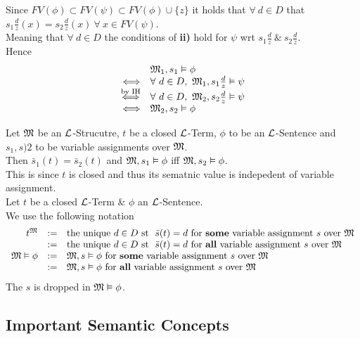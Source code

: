 \documentclass[11pt,a4paper]{article}
\begin{document}
Since $FV(\phi)\subset FV(\psi)\subset FV(\phi)\cup\{z\}$ it holds that $\forall\ d\in D$ that $s_1\frac{d}{z}(x)=s_2\frac{d}{z}(x)\ \forall\ x\in FV(\psi)$.\\
Meaning that $\forall\ d\in D$ the conditions of \textbf{ii)} hold for $\psi$ wrt $s_1\frac{d}{z}\ \&\ s_2\frac{d}{z}$.\\
Hence
\[\begin{array}{rl}
&\M_1,s_1\vDash\phi\\
\Longleftrightarrow&\forall\ d\in D,\ \M_1,s_1\frac{d}{z}\vDash\psi\\
\overset{\text{by IH}}\Longleftrightarrow&\forall\ d\in D,\ \M_2,s_2\frac{d}{z}\vDash\psi\\
\Longleftrightarrow&\M_2,s_2\vDash\phi
\end{array}\]\proved

\theorem{}
Let $\mathfrak{M}$ be an $\mathcal{L}$-Strucutre, $t$ be a closed $\mathcal{L}$-Term, $\phi$ to be an $\mathcal{L}$-Sentence and $s_1,s)2$ to be variable assignments over $\mathfrak{M}$.\\
Then $\bar{s}_1(t)=\bar{s}_2(t)$ and $\mathfrak{M},s_1\vDash\phi$ iff $\mathfrak{M},s_2\vDash\phi$.\\
\nb This is since $t$ is closed and thus its sematnic value is indepedent of variable assignment.\\

\notation{}
Let $t$ be a closed $\mathcal{L}$-Term \& $\phi$ an $\mathcal{L}$-Sentence.\\
We use the following notation
\[\begin{array}{rcl}
t^{\mathfrak{M}}&:=&\text{the unique }d\in D\text{ st }\ \bar{s}(t)=d\text{ for \textbf{some} variable assignment }s\text{ over }\mathfrak{M}\\
&:=&\text{the unique }d\in D\text{ st }\ \bar{s}(t)=d\text{ for \textbf{all} variable assignment }s\text{ over }\mathfrak{M}\\
\mathfrak{M}\vDash\phi&:=&\mathfrak{M},s\vDash\phi\text{ for \textbf{some} variable assignment }s\text{ over }\mathfrak{M}\\
&:=&\mathfrak{M},s\vDash\phi\text{ for \textbf{all} variable assignment }s\text{ over }\mathfrak{M}\\
\end{array}\]
\nb The $s$ is dropped in $\mathfrak{M}\vDash\phi$.

\subsection{Important Semantic Concepts}

\end{document}
